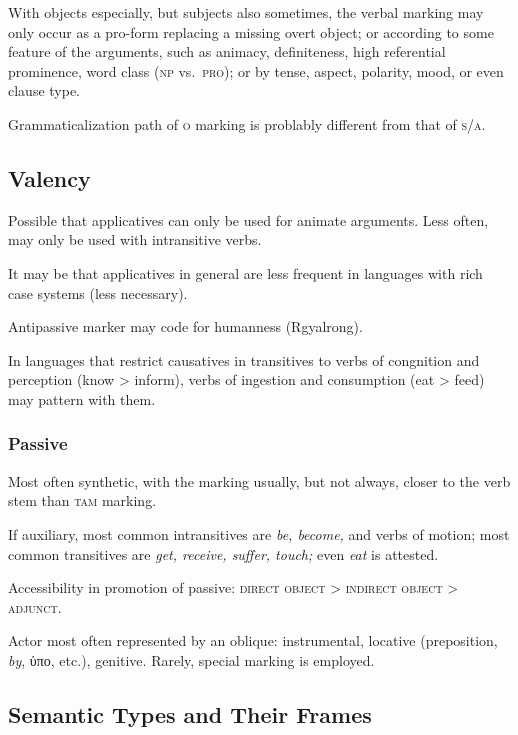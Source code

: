 \documentclass[11pt]{article}
\newcommand{\I}[1]{\textsc{#1}}   %
\begin{document}
With objects especially, but subjects also sometimes, the verbal
marking may only occur as a pro-form replacing a missing overt object;
or according to some feature of the arguments, such as animacy,
definiteness, high referential prominence, word class (\I{np}
vs.\ \I{pro}); or by tense, aspect, polarity, mood, or even clause
type.

Grammaticalization path of \I{o} marking is problably different from
that of \I{s/a}.

\subsection{Valency}
Possible that applicatives can only be used for animate arguments.
Less often, may only be used with intransitive verbs.

It may be that applicatives in general are less frequent in languages
with rich case systems (less necessary).

Antipassive marker may code for humanness (Rgyalrong).

In languages that restrict causatives in transitives to verbs of
congnition and perception (know > inform), verbs of ingestion and
consumption (eat > feed) may pattern with them.

\subsubsection{Passive} Most often synthetic, with the marking usually,
but not always, closer to the verb stem than \I{tam} marking.

If auxiliary, most common intransitives are \textit{be, become,} and
verbs of motion; most common transitives are \textit{get, receive,
suffer, touch;} even \textit{eat} is attested.

Accessibility in promotion of passive: \I{direct object > indirect
object > adjunct}.

Actor most often represented by an oblique: instrumental, locative
(preposition, \textit{by}, ὑπο, etc.), genitive.  Rarely, special
marking is employed.


\subsection{Semantic Types and Their Frames}
\end{document}
